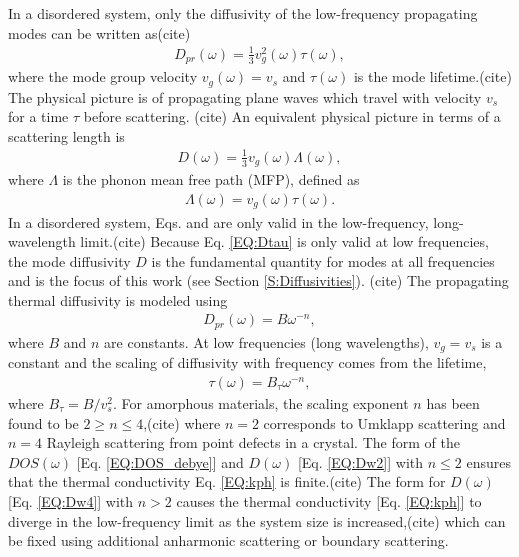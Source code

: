 \documentclass[aps,prb,twocolumn,superscriptaddress,footinbib,amsmath,amssymb,floatfix]{revtex4}
\begin{document}
In a disordered system, only the diffusivity of the low-frequency 
propagating modes can be written as(cite)     
\begin{equation}\label{EQ:Dtau}
\begin{split}
D_{pr}(\omega) = \frac{1}{3}v^2_g(\omega)\tau(\omega),
\end{split}
\end{equation}
where the mode group velocity $v_g(\omega) = v_s$ and $\tau(\omega)$ is 
the mode lifetime.(cite)  
The physical picture is of propagating plane waves which 
travel with velocity $v_s$ for a time $\tau$ before scattering.
(cite) 
An equivalent physical picture in terms of a scattering length 
is
\begin{equation}\label{EQ:DLambda}
\begin{split}
D(\omega) = \frac{1}{3}v_g(\omega) \Lambda(\omega),
\end{split}
\end{equation}
where $\Lambda$ is the phonon mean free path (MFP), defined as 
\begin{equation}\label{EQ:Lambda}
\begin{split}
\Lambda(\omega) = v_{g}(\omega) \tau(\omega).
\end{split}
\end{equation}
In a disordered system, Eqs. and are only valid in the 
low-frequency, long-wavelength limit.(cite) 
Because Eq. \eqref{EQ:Dtau} is only valid at low frequencies, 
the mode diffusivity $D$ is the fundamental quantity for modes at all 
frequencies and is the focus of this work (see Section \ref{S:Diffusivities}).
(cite) 
The propagating thermal diffusivity is modeled using 
\begin{equation}\label{EQ:Dw2}
\begin{split}
D_{pr}(\omega) = B\omega^{-n}, 
\end{split}
\end{equation}
where $B$ and $n$ are constants.   
At low frequencies (long wavelengths), $v_g = v_s$ is a constant 
and the scaling of 
diffusivity with frequency comes from the lifetime, 
\begin{equation}\label{EQ:tauw2}
\begin{split}
\tau(\omega) = B_{\tau} \omega^{-n},
\end{split}
\end{equation}
where $B_{\tau} = B/v_s^2$. For amorphous materials, the scaling exponent $n$ 
has been found to be $2\ge n \le 4$,(cite) 
where $n=2$ corresponds to 
Umklapp scattering\cite{callaway_model_1959} and $n=4$ Rayleigh scattering 
from point defects in a crystal.\cite{klemens_scattering_1955}
The form of the $DOS(\omega)$ [Eq. \eqref{EQ:DOS_debye}] 
and $D(\omega)$ [Eq. \eqref{EQ:Dw2}] with $n\le2$  
ensures that the 
thermal conductivity Eq. \eqref{EQ:kph} is finite.(cite) The form for $D(\omega)$ 
[Eq. \eqref{EQ:Dw4}] with $n>2$ causes the thermal conductivity 
[Eq. \eqref{EQ:kph}] to diverge 
in the low-frequency limit as the system size is increased,(cite) 
which can be fixed using additional anharmonic scattering
\cite{feldman_thermal_1993,feldman_numerical_1999} or 
boundary scattering.\cite{cahill_lower_1994,liu_high_2009,yang_anomalously_2010}
\end{document}
